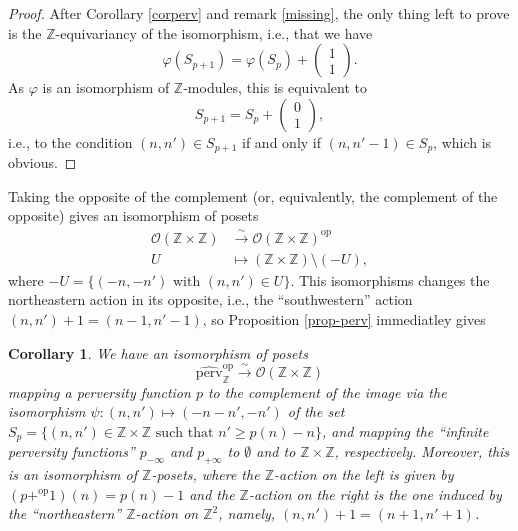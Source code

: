 \documentclass{article}
\newtheorem{cor}[thm]{Corollary}
\theoremstyle{definition}
\newcommand{\Z}{\mathbb{Z}}
\newcommand{\Oo}{\mathcal{O}}
\begin{document}
\begin{proof}
After Corollary \ref{corperv} and remark \ref{missing}, the only thing left to prove is the $\Z$-equivariancy of the isomorphism, i.e., that we have
\[
\varphi(S_{p+1})=\varphi(S_p)+\left(\begin{smallmatrix}1\\1\end{smallmatrix}\right).
\]
As $\varphi$ is an isomorphism of $\Z$-modules, this is equivalent to
\[
S_{p+1}=S_p+\left(\begin{smallmatrix}0\\1\end{smallmatrix}\right),
\]
i.e., to the condition $(n,n')\in S_{p+1}$ if and only if $(n,n'-1)\in S_{p}$, which is obvious.
\end{proof}
Taking the opposite of the complement (or, equivalently, the complement of the opposite) gives an isomorphism of posets
\begin{align*}
\Oo(\Z\times \Z)&\xrightarrow{\sim} \Oo(\Z\times \Z)^{\mathrm{op}}\\
U&\mapsto (\Z\times \Z)\setminus (-U),
\end{align*}
where $-U=\{(-n,-n')\text{ with } (n,n')\in U\}$. This isomorphisms changes the northeastern action in its opposite, i.e., the ``southwestern'' action  $(n,n')+1=(n-1,n'-1)$, so Proposition \ref{prop-perv} immediatley gives 
\begin{cor}
\label{cor-perv2}
We have an isomorphism of posets
\[
\widehat{\mathrm{perv}}_\Z^{\mathrm{op}}\xrightarrow{\sim} \Oo(\Z\times \Z)
\]
mapping a perversity function $p$ to the complement of the image via the isomorphism $\psi\colon (n,n')\mapsto (-n-n',-n')$ of the set $S_p=\{(n,n')\in \Z\times \Z\text{ such that } n'\geq p(n)-n\}$, and mapping the ``infinite perversity functions'' $p_{-\infty}$ and $p_{+\infty}$ to $\emptyset$ and to $\Z\times \Z$, respectively. Moreover, this is an isomorphism of $\Z$-posets, where the $\Z$-action on the left is given by $(p+^{\mathrm{op}}1)(n)=p(n)-1$ and the $\Z$-action on the right is the one induced by the ``northeastern'' $\Z$-action on $\Z^2$, namely, $(n,n')+1=(n+1,n'+1)$. 
\end{cor}
\end{document}
